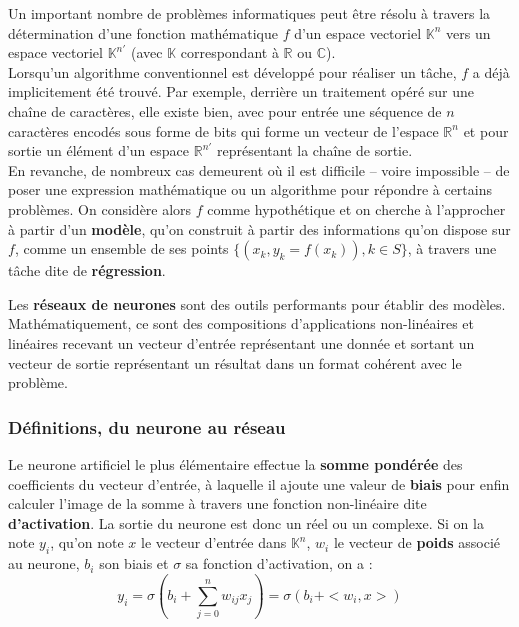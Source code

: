 \documentclass[12pt, french, twoside]{report}
\begin{document}
Un important nombre de problèmes informatiques peut être résolu à travers la détermination d'une fonction mathématique $f$ d'un espace vectoriel $\mathbb{K}^n$ vers un espace vectoriel $\mathbb{K}^{n'}$ (avec $\mathbb{K}$ correspondant à $\mathbb{R}$ ou $\mathbb{C}$).\\
Lorsqu'un algorithme conventionnel est développé pour réaliser un tâche, $f$ a déjà implicitement été trouvé. Par exemple, derrière un traitement opéré sur une chaîne de caractères, elle existe bien, avec pour entrée une séquence de $n$ caractères encodés sous forme de bits qui forme un vecteur de l'espace $\mathbb{R}^n$ et pour sortie un élément d'un espace $\mathbb{R}^{n'}$ représentant la chaîne de sortie.\\
En revanche, de nombreux cas demeurent où il est difficile -- voire impossible -- de poser une expression mathématique ou un algorithme pour répondre à certains problèmes. On considère alors $f$ comme hypothétique et on cherche à l'approcher à partir d'un \textbf{modèle}, qu'on construit à partir des informations qu'on dispose sur $f$, comme un ensemble de ses points $\{(x_k, y_k=f(x_k)), k \in S\}$, à travers une tâche dite de \textbf{régression}.

\vspace{12pt}
Les \textbf{réseaux de neurones} sont des outils performants pour établir des modèles. Mathématiquement, ce sont des compositions d'applications non-linéaires et linéaires recevant un vecteur d'entrée représentant une donnée et sortant un vecteur de sortie représentant un résultat dans un format cohérent avec le problème.

\subsubsection{Définitions, du neurone au réseau}
Le neurone artificiel le plus élémentaire effectue la \textbf{somme pondérée} des coefficients du vecteur d'entrée, à laquelle il ajoute une valeur de \textbf{biais} pour enfin calculer l'image de la somme à travers une fonction non-linéaire dite \textbf{d'activation}. La sortie du neurone est donc un réel ou un complexe. Si on la note $y_i$, qu'on note $x$ le vecteur d'entrée dans $\mathbb{K}^n$, $w_i$ le vecteur de \textbf{poids} associé au neurone, $b_i$ son biais et $\sigma$ sa fonction d'activation, on a :
\begin{equation}
    y_i = \sigma(b_i + \sum_{j=0}^{n} w_{ij}x_j) = \sigma(b_i + <w_i, x>)
\end{equation}\citep[chap. ~7, section 1]{jurafsky}
\end{document}
